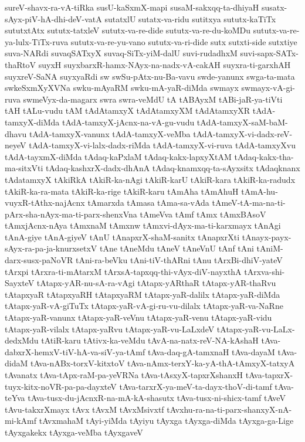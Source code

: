 {sureV-shavx-ra-vA-tiRka
susU-kaSxmX-mapi
susaM-sakxqq-ta-dhiyaH
susatx-sAyx-piV-hA-dhi-deV-vatA
sutatxlU
sutatx-va-ridu
sutitxya
sututx-kaTiTx
sututxtAtx
sututx-tatxleV
sututx-va-re-dide
sututx-va-re-du-koMDu
sututx-va-re-ya-lulx-TiTx-ruva
sututx-va-re-yu-vano
sututx-va-ri-dide
sutx
sutxti-side
sutxtiye
suva-NARdi
suvaqSATxyX
suvaq-SiTx-yiM-dalU
suvi-rudadhxM
suvi-sapx-SATx-thaRtoV
suyxH
suyxbarxR-hamx-NAyx-na-nadx-vA-cakAH
suyxra-ti-garxhAH
suyxreV-SaNA
suyxyaRdi
sw
swSu-pAtx-nu-Ba-vavu
swde-yanunx
swga-ta-mata
swkeSxmXyXVNa
swku-mAyaRM
swku-mA-yaR-diMda
swmayx
swmayx-vA-gi-ruva
swmeVyx-da-magarx
swra
swra-veMdU
tA
tABAyxM
tABi-jaR-ya-tiVti
tAH
tALu-vudu
tAM
tAdAtamxyX
tAdAtamxyXM
tAdAtamxyXR
tAdA-tamxyX-diMda
tAdA-tamxyX-jAcnx-na-vA-gu-vudu
tAdA-tamxyX-saM-baM-dhavu
tAdA-tamxyX-vanunx
tAdA-tamxyX-veMba
tAdA-tamxyX-vi-dadx-reV-neyeV
tAdA-tamxyX-vi-lalx-dadx-riMda
tAdA-tamxyX-vi-ruva
tAdA-tamxyXvu
tAdA-tayxmX-diMda
tAdaq-kaPxlaM
tAdaq-kakx-lapxyXtAM
tAdaq-kakx-tha-ma-sitxVti
tAdaq-kashxrX-dadx-dhAnA
tAdaq-knamxqq-ta-sAyxsitx
tAdaqknanx
tAdatamxyX
tAkiRkA
tAkiR-ka-nAgi
tAkiR-karU
tAkiR-kara
tAkiR-ka-radudx
tAkiR-ka-ra-mata
tAkiR-ka-rige
tAkiR-karu
tAmAha
tAmAhuH
tAmA-hu-vuyxR-tAthx-najAcnx
tAmarxda
tAmasa
tAma-sa-vAda
tAmeV-tA-ma-na-ti-pArx-sha-nAyx-ma-ti-parx-shenxVna
tAmeVva
tAmf
tAmx
tAmxBAsoV
tAmxjAcnx-nAya
tAmxnaM
tAmxnw
tAmxvi-dAyx-ma-ti-karxmayx
tAnAgi
tAnA-giye
tAnA-giyeV
tAnU
tAnapxrX-shaM-sanitx
tAnapxrXti
tAnayx-payx-sAyx-ra-pa-ja-knurxsetxV
tAne
tAneMdu
tAneV
tAneVnU
tAnf
tAni
tAniM-darx-susx-paNoVR
tAni-ra-beVku
tAni-tiV-thARni
tAnu
tArxBi-dhiV-yateV
tArxpi
tArxra-ti-mAtarxM
tArxsA-tapxqq-thi-vAyx-diV-nayxthA
tArxva-shi-SayxteV
tAtapx-yAR-nu-sA-ra-vAgi
tAtapx-yARthaR
tAtapx-yAR-thaRvu
tAtapxyaR
tAtapxyaRH
tAtapxyaRM
tAtapx-yaR-dalilx
tAtapx-yaR-diMda
tAtapx-yaR-vA-giTuTx
tAtapx-yaR-vA-gi-ru-vu-dilalx
tAtapx-yaR-va-NaRne
tAtapx-yaR-vanunx
tAtapx-yaR-veVnu
tAtapx-yaR-venu
tAtapx-yaR-vidu
tAtapx-yaR-vilalx
tAtapx-yaRvu
tAtapx-yaR-vu-LaLxdeV
tAtapx-yaR-vu-LaLx-dedxMdu
tAtiR-karu
tAtivx-ka-veMdu
tAvA-na-natx-reV-NA-kAshaH
tAva-dabxrX-hemxV-tiV-hA-va-siV-ya-tAmf
tAva-daq-gA-tamxnaH
tAva-dayaM
tAva-didaM
tAva-nABx-torxV-kitxtoV
tAva-nAmx-terxY-ka-yA-thA-tAmxyX-tatxyA
tAvanatx
tAva-tApx-raM-pa-yeVRNa
tAva-tAsxyX-tapxrXshanxH
tAva-tapxrX-tuyx-kitx-noVR-pa-pa-dayxteV
tAva-tarxrX-ya-meV-ta-dayx-thoV-di-tamf
tAva-teYva
tAva-tusx-du-jAcnxR-na-mA-kA-shasutx
tAva-tusx-ni-shicx-tamf
tAveV
tAvu-takxrXmayx
tAvx
tAvxM
tAvxMsivxtf
tAvxhu-ra-na-ti-parx-shanxyX-nA-mi-kAmf
tAvxmahaM
tAyi-yiMda
tAyiyu
tAyxga
tAyxga-diMda
tAyxga-ga-Lige
tAyxgakekx
tAyxga-veMba
tAyxgaveV
}
